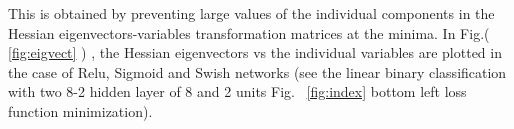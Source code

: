 \documentclass{article}
\begin{document}
This is obtained by preventing large values of the individual components in the Hessian eigenvectors-variables transformation matrices at the minima. In Fig.( \ref{fig:eigvect} ) , the Hessian eigenvectors vs the individual variables are plotted in the case of Relu, Sigmoid and Swish networks (see the linear binary classification with two 8-2 hidden layer of 8 and 2 units Fig. ~\eqref{fig:index} bottom left loss function minimization).
%
%









\end{document}
